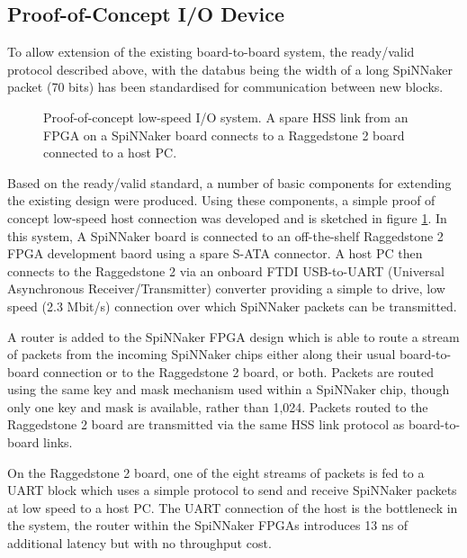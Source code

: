 			\subsection{Proof-of-Concept I/O Device}
				
				
				To allow extension of the existing board-to-board system, the
				ready/valid protocol described above, with the databus being the width
				of a long SpiNNaker packet (70 bits) has been standardised for
				communication between new blocks.
				
				\begin{figure}
					\center
					
					
					\caption[Proof-of-concept low-speed I/O system.]{Proof-of-concept
					low-speed I/O system. A spare HSS link from an FPGA on a SpiNNaker
					board connects to a Raggedstone 2 board connected to a host PC.}
					\label{fig:proof-of-concept-fpga-links}
				\end{figure}
				
				Based on the ready/valid standard, a number of basic components for
				extending the existing design were produced. Using these components, a
				simple proof of concept low-speed host connection was developed and is
				sketched in figure \ref{fig:proof-of-concept-fpga-links}. In this
				system, A SpiNNaker board is connected to an off-the-shelf Raggedstone 2
				FPGA development baord \cite{raggedstone2} using a spare S-ATA
				connector. A host PC then connects to the Raggedstone 2 via an onboard
				FTDI USB-to-UART (Universal Asynchronous Receiver/Transmitter) converter
				providing a simple to drive, low speed (2.3 Mbit/s) connection over
				which SpiNNaker packets can be transmitted.
				
				A router is added to the SpiNNaker FPGA design which is able to route a
				stream of packets from the incoming SpiNNaker chips either along their
				usual board-to-board connection or to the Raggedstone 2 board, or both.
				Packets are routed using the same key and mask mechanism used within a
				SpiNNaker chip, though only one key and mask is available, rather than
				1,024. Packets routed to the Raggedstone 2 board are transmitted via the
				same HSS link protocol as board-to-board links.
				
				On the Raggedstone 2 board, one of the eight streams of packets is fed
				to a UART block which uses a simple protocol to send and receive
				SpiNNaker packets at low speed to a host PC. The UART connection of the
				host is the bottleneck in the system, the router within the SpiNNaker
				FPGAs introduces 13 ns of additional latency but with no throughput
				cost.
				
